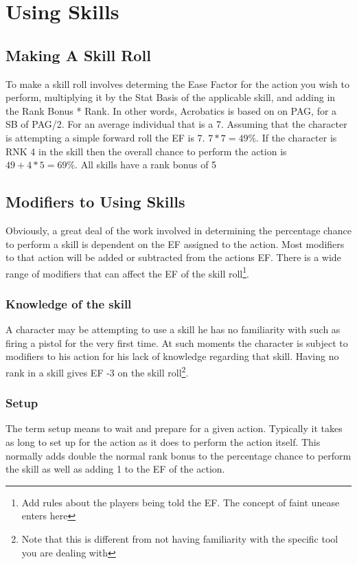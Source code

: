 \section{Using Skills}
\subsection{Making A Skill Roll}

To make a skill roll involves determing the Ease Factor for the action
you wish to perform, multiplying it by the Stat Basis of the applicable
skill, and adding in the Rank Bonus * Rank. In other words, Acrobatics
is based on on PAG, for a SB of PAG/2. For an average individual that
is a 7. Assuming that the  character is attempting a simple forward
roll the EF is 7. \(7*7 = 49\%\). If the character is RNK 4 in the
skill then  the overall chance to perform the action is \(49 + 4 * 5 =
69\%\). All skills have a rank bonus of 5%

\subsection{Modifiers to Using Skills}
Obviously, a great deal of the work involved in determining the
percentage chance to perform a skill is dependent on the EF assigned to the
action. Most modifiers to that action will be added or subtracted from
the actions EF. There is a wide range of modifiers that can affect the EF 
of the skill roll\footnote{Add rules about the players being told the 
EF. The concept of faint unease enters here}.

\subsubsection{Knowledge of the skill}
A character may be attempting to use a skill he has no familiarity 
with such as firing a pistol for the very first time. At such moments 
the character is subject to modifiers to his action for his lack of 
knowledge regarding that skill. Having no rank in a skill gives EF -3
on the skill roll\footnote{Note that this is different from not 
having familiarity with the specific tool you are dealing with}.

\subsubsection{Setup}
The term setup means to wait and prepare for a given action. Typically it
takes as long to set up for the action as it does to perform the action itself.
This normally adds double the normal rank bonus to the percentage chance
to perform the skill as well as adding 1 to the EF of the action.

